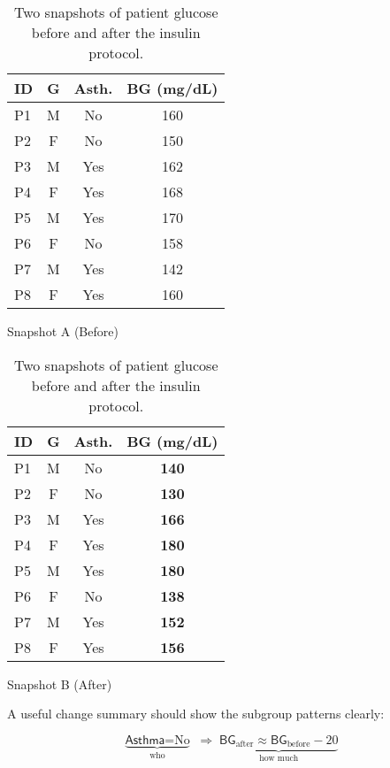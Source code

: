 \documentclass[9pt, twoside, twocolumn]{extarticle}
\begin{document}
\begin{table}[h]
  \centering
  \begin{subtable}[t]{0.48\columnwidth}
    \centering
    \scriptsize
    \begin{tabular}{lccc}
      \hline
      ID & G & Asth. & BG (mg/dL) \\
      \hline
      P1 & M & No  & 160 \\
      P2 & F & No  & 150 \\
      P3 & M & Yes & 162 \\
      P4 & F & Yes & 168 \\
      P5 & M & Yes & 170 \\
      P6 & F & No  & 158 \\
      P7 & M & Yes & 142 \\
      P8 & F & Yes & 160 \\
      \hline
    \end{tabular}
    \caption{Snapshot A (Before)}
    \label{tab:snapshots-before}
  \end{subtable}
  \hfill
  \begin{subtable}[t]{0.48\columnwidth}
    \centering
    \scriptsize
    \begin{tabular}{lccc}
      \hline
      ID & G & Asth. & BG (mg/dL) \\
      \hline
      P1 & M & No  & \textbf{140} \\
      P2 & F & No  & \textbf{130} \\
      P3 & M & Yes & \textbf{166} \\
      P4 & F & Yes & \textbf{180} \\
      P5 & M & Yes & \textbf{180} \\
      P6 & F & No  & \textbf{138} \\
      P7 & M & Yes & \textbf{152} \\
      P8 & F & Yes & \textbf{156} \\
      \hline
    \end{tabular}
    \caption{Snapshot B (After)}
    \label{tab:snapshots-after}
  \end{subtable}
  \caption{Two snapshots of patient glucose before and after the insulin protocol.}
  \label{tab:snapshots}
\end{table}

A useful change summary should show the subgroup patterns clearly:

\[
\underbrace{\textsf{Asthma}=\text{No}}_{\text{who}}
\;\Rightarrow\;
\underbrace{\textsf{BG}_{\text{after}} \approx \textsf{BG}_{\text{before}} - 20}_{\text{how much}}
\]
\end{document}
